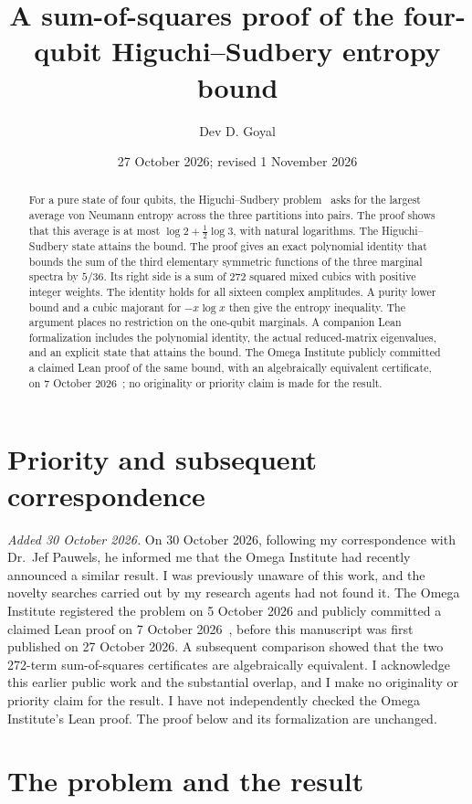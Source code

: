 \documentclass[11pt]{article}
\title{A sum-of-squares proof of the four-qubit\newline
Higuchi--Sudbery entropy bound}
\author{Dev D. Goyal}
\date{27 October 2026; revised 1 November 2026}
\theoremstyle{definition}
\theoremstyle{remark}
\begin{document}
\maketitle

\begin{abstract}
For a pure state of four qubits, the Higuchi--Sudbery problem~\cite{HS00} asks for the largest average von Neumann entropy across the three partitions into pairs. The proof shows that this average is at most $\log2+\tfrac12\log3$, with natural logarithms. The Higuchi--Sudbery state attains the bound. The proof gives an exact polynomial identity that bounds the sum of the third elementary symmetric functions of the three marginal spectra by $5/36$. Its right side is a sum of 272 squared mixed cubics with positive integer weights. The identity holds for all sixteen complex amplitudes. A purity lower bound and a cubic majorant for $-x\log x$ then give the entropy inequality. The argument places no restriction on the one-qubit marginals. A companion Lean formalization includes the polynomial identity, the actual reduced-matrix eigenvalues, and an explicit state that attains the bound. The Omega Institute publicly committed a claimed Lean proof of the same bound, with an algebraically equivalent certificate, on 7 October 2026~\cite{OMEGA}; no originality or priority claim is made for the result.
\end{abstract}

\section*{Priority and subsequent correspondence}
\emph{Added 30 October 2026.} On 30 October 2026, following my correspondence with Dr.~Jef Pauwels, he informed me that the Omega Institute had recently announced a similar result. I was previously unaware of this work, and the novelty searches carried out by my research agents had not found it. The Omega Institute registered the problem on 5 October 2026 and publicly committed a claimed Lean proof on 7 October 2026~\cite{OMEGA}, before this manuscript was first published on 27 October 2026. A subsequent comparison showed that the two 272-term sum-of-squares certificates are algebraically equivalent. I acknowledge this earlier public work and the substantial overlap, and I make no originality or priority claim for the result. I have not independently checked the Omega Institute's Lean proof. The proof below and its formalization are unchanged.

\section{The problem and the result}
\end{document}
